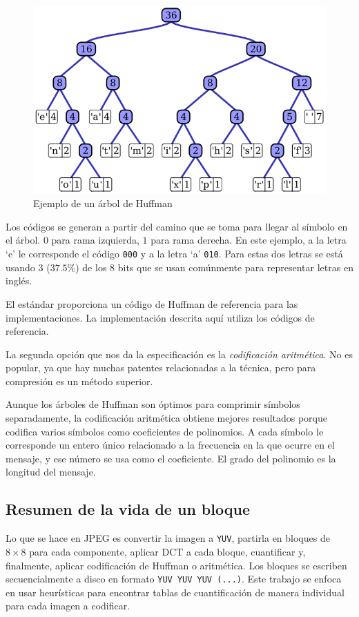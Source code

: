 \begin{figure}[h]
    \includegraphics[width=1.0\textwidth]{Huffman}
    \caption{Ejemplo de un árbol de Huffman}
    \label{fig:huffman}
\end{figure}

Los códigos se generan a partir del camino que se toma para llegar al símbolo
en el árbol. $0$ para rama izquierda, $1$ para rama derecha. En este ejemplo, a
la letra `e' le corresponde el código \verb+000+ y a la letra `a' \verb+010+.
Para estas dos letras se está usando 3 ($37.5\%$) de los 8 bits que se
usan comúnmente para representar letras en inglés.

El estándar proporciona un código de Huffman de referencia para las
implementaciones. La implementación descrita aquí utiliza los códigos de
referencia.

La segunda opción que nos da la especificación es la \emph{\gls{codificación
aritmética}}. No es popular, ya que hay muchas patentes relacionadas a la
técnica, pero para compresión es un método superior.

Aunque los árboles de Huffman son óptimos para comprimir símbolos
separadamente, la codificación aritmética obtiene mejores resultados porque
codifica varios símbolos como coeficientes de polinomios. A cada símbolo le
corresponde un entero único relacionado a la frecuencia en la que ocurre en el
mensaje, y ese número se usa como el coeficiente. El grado del polinomio es la
longitud del mensaje.

\subsection{Resumen de la vida de un bloque}

Lo que se hace en JPEG es convertir la imagen a \verb+YUV+, partirla en bloques
de $8\times8$ para cada componente, aplicar DCT a cada bloque, cuantificar y,
finalmente, aplicar codificación de Huffman o aritmética. Los bloques se
escriben secuencialmente a disco en formato \verb+YUV YUV YUV (...)+. Este
trabajo se enfoca en usar heurísticas para encontrar tablas de cuantificación
de manera individual para cada imagen a codificar.

%
